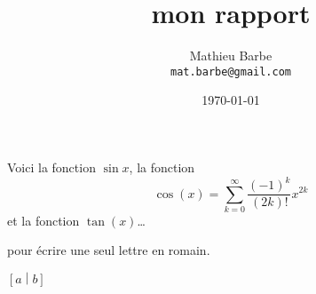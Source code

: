 


\title{mon rapport}
\author{Mathieu Barbe\\
\texttt{mat.barbe@gmail.com}}
\date{\today}

\maketitle
  
  Voici la fonction $\sin x$,
  la fonction \[\cos(x)=\sum_{k=0}^{\infty}\frac{(-1)^k}{(2k)!}x^{2k}\]
  et la fonction $\tan (x)$\ldots



\text 
pour écrire une seul lettre en romain. 
\mathrm

\left
\right
\middle
\( \left[ a \middle| b \right] \)